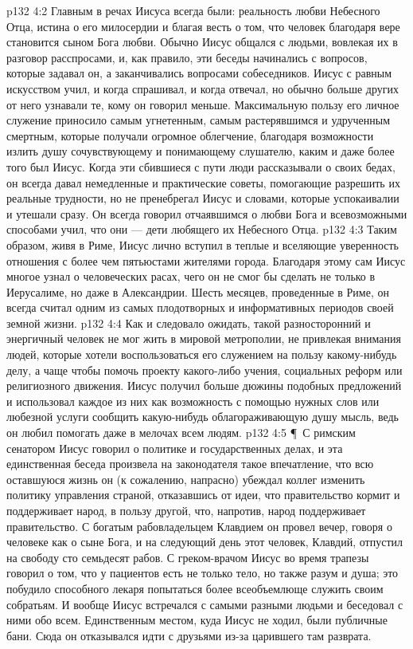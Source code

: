 \vs p132 4:2 Главным в речах Иисуса всегда были: реальность любви Небесного Отца, истина о его милосердии и благая весть о том, что человек благодаря вере становится сыном Бога любви. Обычно Иисус общался с людьми, вовлекая их в разговор расспросами, и, как правило, эти беседы начинались с вопросов, которые задавал он, а заканчивались вопросами собеседников. Иисус с равным искусством учил, и когда спрашивал, и когда отвечал, но обычно больше других от него узнавали те, кому он говорил меньше. Максимальную пользу его личное служение приносило самым угнетенным, самым растерявшимся и удрученным смертным, которые получали огромное облегчение, благодаря возможности излить душу сочувствующему и понимающему слушателю, каким и даже более того был Иисус. Когда эти сбившиеся с пути люди рассказывали о своих бедах, он всегда давал немедленные и практические советы, помогающие разрешить их реальные трудности, но не пренебрегал Иисус и словами, которые успокаивалии и утешали сразу. Он всегда говорил отчаявшимся о любви Бога и всевозможными способами учил, что они --- дети любящего их Небесного Отца.
\vs p132 4:3 Таким образом, живя в Риме, Иисус лично вступил в теплые и вселяющие уверенность отношения с более чем пятьюстами жителями города. Благодаря этому сам Иисус многое узнал о человеческих расах, чего он не смог бы сделать не только в Иерусалиме, но даже в Александрии. Шесть месяцев, проведенные в Риме, он всегда считал одним из самых плодотворных и информативных периодов своей земной жизни.
\vs p132 4:4 Как и следовало ожидать, такой разносторонний и энергичный человек не мог жить в мировой метрополии, не привлекая внимания людей, которые хотели воспользоваться его служением на пользу какому\hyp{}нибудь делу, а чаще чтобы помочь проекту какого\hyp{}либо учения, социальных реформ или религиозного движения. Иисус получил больше дюжины подобных предложений и использовал каждое из них как возможность с помощью нужных слов или любезной услуги сообщить какую\hyp{}нибудь облагораживающую душу мысль, ведь он любил помогать даже в мелочах всем людям.
\vs p132 4:5 \P\ С римским сенатором Иисус говорил о политике и государственных делах, и эта единственная беседа произвела на законодателя такое впечатление, что всю оставшуюся жизнь он (к сожалению, напрасно) убеждал коллег изменить политику управления страной, отказавшись от идеи, что правительство кормит и поддерживает народ, в пользу другой, что, напротив, народ поддерживает правительство. С богатым рабовладельцем Клавдием он провел вечер, говоря о человеке как о сыне Бога, и на следующий день этот человек, Клавдий, отпустил на свободу сто семьдесят рабов. С греком\hyp{}врачом Иисус во время трапезы говорил о том, что у пациентов есть не только тело, но также разум и душа; это побудило способного лекаря попытаться более всеобъемлюще служить своим собратьям. И вообще Иисус встречался с самыми разными людьми и беседовал с ними обо всем. Единственным местом, куда Иисус не ходил, были публичные бани. Сюда он отказывался идти с друзьями из\hyp{}за царившего там разврата.

